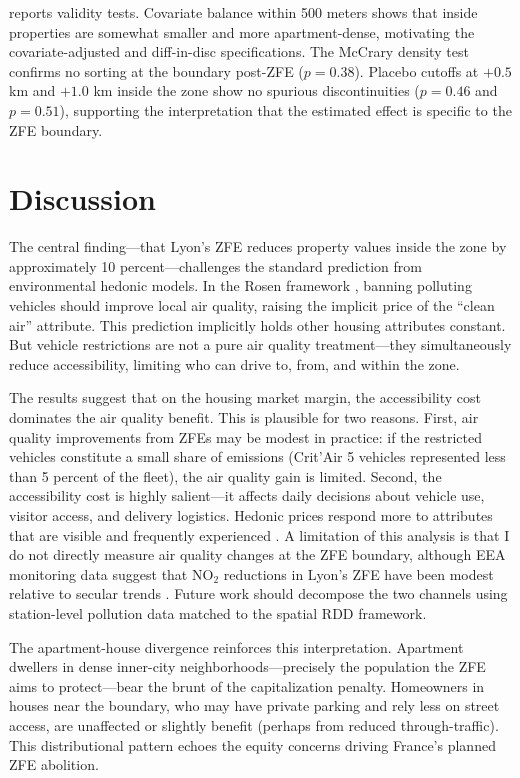 \documentclass[12pt]{article}
\begin{document}
 reports validity tests. Covariate balance within 500 meters shows that inside properties are somewhat smaller and more apartment-dense, motivating the covariate-adjusted and diff-in-disc specifications. The McCrary density test confirms no sorting at the boundary post-ZFE ($p = 0.38$). Placebo cutoffs at $+0.5$ km and $+1.0$ km inside the zone show no spurious discontinuities ($p = 0.46$ and $p = 0.51$), supporting the interpretation that the estimated effect is specific to the ZFE boundary.


\section{Discussion}

The central finding---that Lyon's ZFE reduces property values inside the zone by approximately 10 percent---challenges the standard prediction from environmental hedonic models. In the Rosen framework \citep{rosen1974hedonic}, banning polluting vehicles should improve local air quality, raising the implicit price of the ``clean air'' attribute. This prediction implicitly holds other housing attributes constant. But vehicle restrictions are not a pure air quality treatment---they simultaneously reduce accessibility, limiting who can drive to, from, and within the zone.

The results suggest that on the housing market margin, the accessibility cost dominates the air quality benefit. This is plausible for two reasons. First, air quality improvements from ZFEs may be modest in practice: if the restricted vehicles constitute a small share of emissions (Crit'Air 5 vehicles represented less than 5 percent of the fleet), the air quality gain is limited. Second, the accessibility cost is highly salient---it affects daily decisions about vehicle use, visitor access, and delivery logistics. Hedonic prices respond more to attributes that are visible and frequently experienced \citep{linden2008estimates}. A limitation of this analysis is that I do not directly measure air quality changes at the ZFE boundary, although EEA monitoring data suggest that NO$_2$ reductions in Lyon's ZFE have been modest relative to secular trends \citep{gehrsitz2017effect}. Future work should decompose the two channels using station-level pollution data matched to the spatial RDD framework.

The apartment-house divergence reinforces this interpretation. Apartment dwellers in dense inner-city neighborhoods---precisely the population the ZFE aims to protect---bear the brunt of the capitalization penalty. Homeowners in houses near the boundary, who may have private parking and rely less on street access, are unaffected or slightly benefit (perhaps from reduced through-traffic). This distributional pattern echoes the equity concerns driving France's planned ZFE abolition.
\end{document}
